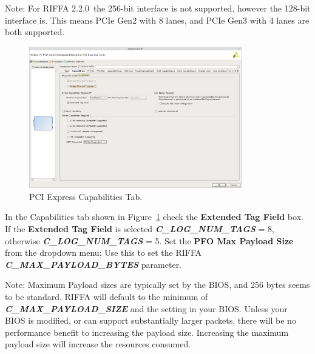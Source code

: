\documentclass{refrep}
\newcommand{\RIFFAVer}{2.2.0}
\newcommand{\ConfigSetting}[1]{\textbf{#1}}
\newcommand{\RIFFAParameter}[1]{\textit{\textbf{#1}}}
\begin{document}
Note: For RIFFA \RIFFAVer~the 256-bit interface is not supported, however the
128-bit interface is. This means PCIe Gen2 with 8 lanes, and PCIe Gen3 with 4
lanes are both supported.

\begin{figure}[H]
  \includegraphics[width=350px,center]{Gen3IntegratedTabCapabilities.png}
  \caption{PCI Express Capabilities Tab.}
  \label{Fig:Gen3Integrated:Generating:Gen3IntegratedTabCapabilities}
\end{figure}
In the Capabilities tab shown in
Figure~\ref{Fig:Gen3Integrated:Generating:Gen3IntegratedTabCapabilities} check
the \ConfigSetting{Extended Tag Field} box. If the \ConfigSetting{Extended Tag
  Field} is selected \RIFFAParameter{C\_LOG\_NUM\_TAGS} = 8, otherwise
\RIFFAParameter{C\_LOG\_NUM\_TAGS} = 5. Set the \ConfigSetting{PFO Max Payload
  Size} from the dropdown menu; Use this to set the RIFFA
\RIFFAParameter{C\_MAX\_PAYLOAD\_BYTES} parameter.

Note: Maximum Payload sizes are typically set by the BIOS, and 256 bytes seems
to be standard. RIFFA will default to the minimum of
\RIFFAParameter{C\_MAX\_PAYLOAD\_SIZE} and the setting in your BIOS. Unless your
BIOS is modified, or can support substantially larger packets, there will be no
performance benefit to increasing the payload size. Increasing the maximum
payload size will increase the resources consumed.
\end{document}
